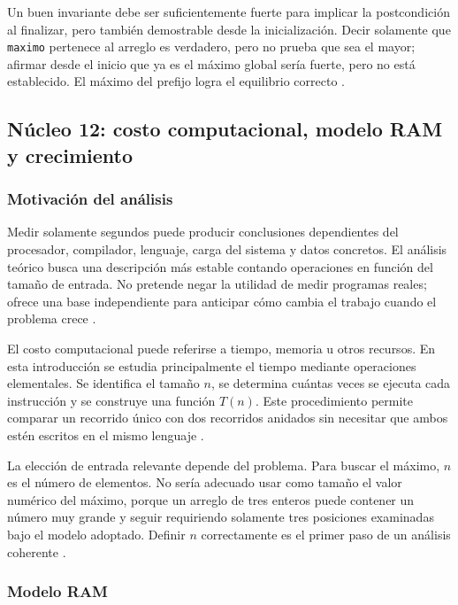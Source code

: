 \documentclass[12pt,letterpaper]{article}
\newcommand{\codigo}[1]{\texttt{#1}}
\begin{document}
Un buen invariante debe ser suficientemente fuerte para implicar la postcondición al finalizar, pero también demostrable desde la inicialización. Decir solamente que \codigo{maximo} pertenece al arreglo es verdadero, pero no prueba que sea el mayor; afirmar desde el inicio que ya es el máximo global sería fuerte, pero no está establecido. El máximo del prefijo logra el equilibrio correcto \citep{apt2009,cormen2022,dijkstra1975}.

\subsection{Núcleo 12: costo computacional, modelo RAM y crecimiento}

\subsubsection{Motivación del análisis}

Medir solamente segundos puede producir conclusiones dependientes del procesador, compilador, lenguaje, carga del sistema y datos concretos. El análisis teórico busca una descripción más estable contando operaciones en función del tamaño de entrada. No pretende negar la utilidad de medir programas reales; ofrece una base independiente para anticipar cómo cambia el trabajo cuando el problema crece \citep{zanabria2026,cormen2022,sedgewick2011}.

El costo computacional puede referirse a tiempo, memoria u otros recursos. En esta introducción se estudia principalmente el tiempo mediante operaciones elementales. Se identifica el tamaño $n$, se determina cuántas veces se ejecuta cada instrucción y se construye una función $T(n)$. Este procedimiento permite comparar un recorrido único con dos recorridos anidados sin necesitar que ambos estén escritos en el mismo lenguaje \citep{cormen2022,skiena2020,knuth1997}.

La elección de entrada relevante depende del problema. Para buscar el máximo, $n$ es el número de elementos. No sería adecuado usar como tamaño el valor numérico del máximo, porque un arreglo de tres enteros puede contener un número muy grande y seguir requiriendo solamente tres posiciones examinadas bajo el modelo adoptado. Definir $n$ correctamente es el primer paso de un análisis coherente \citep{cormen2022,goodrichpy2013,sedgewick2011}.

\subsubsection{Modelo RAM}
\end{document}
